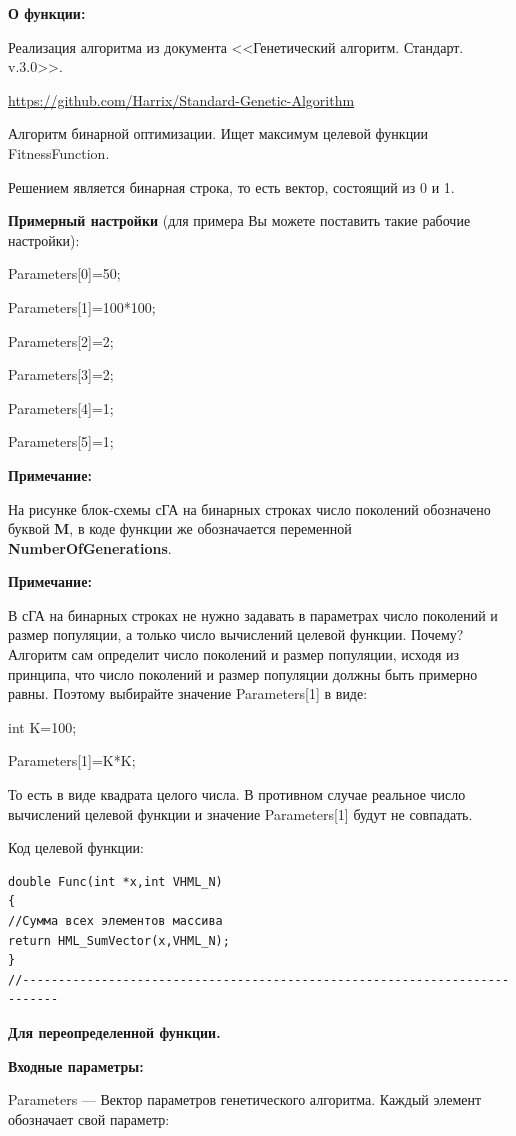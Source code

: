 \textbf{О функции:}

Реализация алгоритма из документа <<Генетический алгоритм. Стандарт. v.3.0>>.

\href{https://github.com/Harrix/Standard-Genetic-Algorithm}{https://github.com/Harrix/Standard-Genetic-Algorithm}

Алгоритм бинарной оптимизации. Ищет максимум целевой функции FitnessFunction.

Решением является бинарная строка, то есть вектор, состоящий из 0 и 1.

\textbf{Примерный настройки} (для примера Вы можете поставить такие рабочие настройки):

 Parameters[0]=50;
 
Parameters[1]=100*100;

Parameters[2]=2;

Parameters[3]=2;

Parameters[4]=1;

Parameters[5]=1;


\textbf{Примечание:}

 На рисунке блок-схемы сГА на бинарных строках число поколений обозначено буквой \textbf{M}, в коде функции же обозначается переменной \textbf{NumberOfGenerations}.


\textbf{Примечание:}

 В сГА на бинарных строках не нужно задавать в параметрах число поколений и размер популяции, а только число вычислений целевой функции. Почему? Алгоритм сам определит число поколений и размер популяции, исходя из принципа, что число поколений и размер популяции должны быть примерно равны. Поэтому выбирайте значение Parameters[1] в виде:

int K=100;

Parameters[1]=K*K;

То есть в виде квадрата целого числа. В противном случае реальное число вычислений целевой функции и значение Parameters[1] будут не совпадать.

Код целевой функции:
\begin{lstlisting}[caption=Оптимизируемая функция]
double Func(int *x,int VHML_N)
{
//Сумма всех элементов массива
return HML_SumVector(x,VHML_N);
}
//---------------------------------------------------------------------------
\end{lstlisting}

\textbf{Для переопределенной функции.}

\textbf{Входные параметры:}
 
Parameters --- Вектор параметров генетического алгоритма. Каждый элемент обозначает свой параметр:
 
